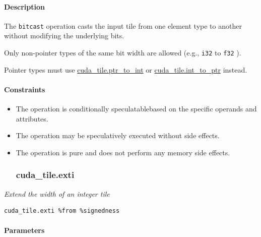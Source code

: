 \documentclass{article}
\begin{document}
\begin{itemize}
\paragraph{Description}

\end{itemize}
The \texttt{bitcast} operation casts the input tile from one element type to another without modifying the underlying bits.


Only non-pointer types of the same bit width are allowed (e.g., \texttt{i32} to \texttt{f32} ).

Pointer types must use \href{https://docs.nvidia.com/cuda/tile-ir/latest/sections/operations.html#op-cuda-tile-ptr-to-int}{cuda\_tile.ptr\_to\_int} or \href{https://docs.nvidia.com/cuda/tile-ir/latest/sections/operations.html#op-cuda-tile-int-to-ptr}{cuda\_tile.int\_to\_ptr} instead.



\paragraph{Constraints}

\begin{itemize}
\item The operation is conditionally speculatablebased on the specific operands and attributes.
\item The operation may be speculatively executed without side effects.
\item The operation is pure and does not perform any memory side effects.


\subsubsection{cuda\_tile.exti}

\end{itemize}
\textit{Extend the width of an integer tile}


\begin{lstlisting}
cuda_tile.exti %from %signedness
\end{lstlisting}

\paragraph{Parameters}
\end{document}
